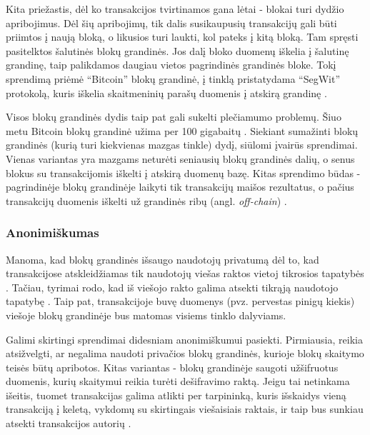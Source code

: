 Kita priežastis, dėl ko transakcijos tvirtinamos gana lėtai - blokai turi dydžio apribojimus. Dėl šių apribojimų, tik dalis susikaupusių transakcijų gali būti priimtos
į naują bloką, o likusios turi laukti, kol pateks į kitą bloką. Tam spręsti pasitelktos šalutinės blokų grandinės. Jos dalį bloko duomenų iškelia į šalutinę grandinę,
taip palikdamos daugiau vietos pagrindinės grandinės bloke. Tokį sprendimą priėmė \enquote{Bitcoin} blokų grandinė, į tinklą pristatydama \enquote{SegWit} protokolą, kuris iškelia skaitmeninių
parašų duomenis į atskirą grandinę \cite{Segwit}.

Visos blokų grandinės dydis taip pat gali sukelti plečiamumo problemų. Šiuo metu Bitcoin blokų grandinė užima per 100 gigabaitų \cite{Zheng2017}. Siekiant sumažinti blokų grandinės
(kurią turi kiekvienas mazgas tinkle) dydį,
siūlomi įvairūs sprendimai. Vienas variantas yra mazgams neturėti seniausių blokų grandinės dalių, o senus blokus su transakcijomis iškelti į atskirą duomenų bazę.
Kitas sprendimo būdas - pagrindinėje blokų grandinėje laikyti tik transakcijų maišos rezultatus, o pačius transakcijų duomenis
iškelti už grandinės ribų (angl. \textit{off-chain}) \cite{Lo2017}.

\subsubsection{Anonimiškumas}

Manoma, kad blokų grandinės išsaugo naudotojų privatumą dėl to, kad transakcijose atskleidžiamas tik naudotojų
viešas raktos vietoj tikrosios tapatybės \cite{Zheng2017}. Tačiau, tyrimai rodo, kad iš viešojo rakto galima
atsekti tikrąją naudotojo tapatybę \cite{Barcelo2007}. Taip pat, transakcijoje buvę duomenys (pvz. pervestas pinigų kiekis)
viešoje blokų grandinėje bus matomas visiems tinklo dalyviams.

Galimi skirtingi sprendimai didesniam anonimiškumui pasiekti. Pirmiausia, reikia atsižvelgti, ar negalima naudoti privačios blokų grandinės, kurioje
blokų skaitymo teisės būtų apribotos. Kitas variantas - blokų grandinėje saugoti užšifruotus duomenis, kurių skaitymui
reikia turėti dešifravimo raktą. Jeigu tai netinkama išeitis, tuomet transakcijas galima atlikti per tarpininką, kuris išskaidys vieną transakciją
į keletą, vykdomų su skirtingais viešaisiais raktais, ir taip bus sunkiau atsekti transakcijos autorių \cite{Zheng2017}.

